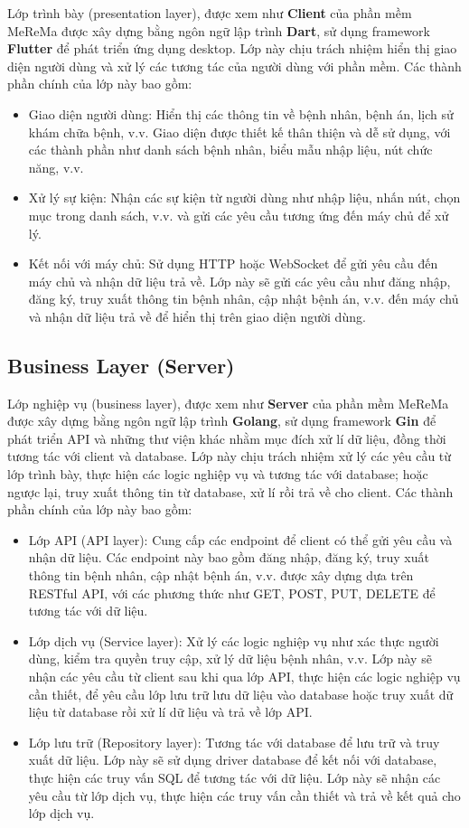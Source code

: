 Lớp trình bày (presentation layer), được xem như \textbf{Client} của phần mềm MeReMa được xây dựng bằng ngôn ngữ lập trình \textbf{Dart}, sử dụng framework \textbf{Flutter} để phát triển ứng dụng desktop. Lớp này chịu trách nhiệm hiển thị giao diện người dùng và xử lý các tương tác của người dùng với phần mềm. Các thành phần chính của lớp này bao gồm:
\begin{itemize}
  \item Giao diện người dùng: Hiển thị các thông tin về bệnh nhân, bệnh án, lịch sử khám chữa bệnh, v.v. Giao diện được thiết kế thân thiện và dễ sử dụng, với các thành phần như danh sách bệnh nhân, biểu mẫu nhập liệu,
    nút chức năng, v.v.
  \item Xử lý sự kiện: Nhận các sự kiện từ người dùng như nhập liệu, nhấn nút, chọn mục trong danh sách, v.v. và gửi các yêu cầu tương ứng đến máy chủ để xử lý.
  \item Kết nối với máy chủ: Sử dụng HTTP hoặc WebSocket để gửi yêu cầu đến máy chủ và nhận dữ liệu trả về. Lớp này sẽ gửi các yêu cầu như đăng nhập, đăng ký, truy xuất thông tin bệnh nhân, cập nhật bệnh án, v.v. đến máy chủ và nhận dữ liệu trả về để hiển thị trên giao diện người dùng.
\end{itemize}

\subsection{Business Layer (Server)}

Lớp nghiệp vụ (business layer), được xem như \textbf{Server} của phần mềm MeReMa được xây dựng bằng ngôn ngữ lập trình \textbf{Golang}, sử dụng framework \textbf{Gin} để phát triển API và những thư viện khác nhằm mục đích xử lí dữ liệu, đồng thời tương tác với client và database. Lớp này chịu trách nhiệm xử lý các yêu cầu từ lớp trình bày, thực hiện các logic nghiệp vụ và tương tác với database; hoặc ngược lại, truy xuất thông tin từ database, xử lí rồi trả về cho client. Các thành phần chính của lớp này bao gồm:
\begin{itemize}
  \item Lớp API (API layer): Cung cấp các endpoint để client có thể gửi yêu cầu và nhận dữ liệu. Các endpoint này bao gồm đăng nhập, đăng ký, truy xuất thông tin bệnh nhân, cập nhật bệnh án, v.v. được xây dựng dựa trên RESTful API, với các phương thức như GET, POST, PUT, DELETE để tương tác với dữ liệu.
  \item Lớp dịch vụ (Service layer): Xử lý các logic nghiệp vụ như xác thực người dùng, kiểm tra quyền truy cập, xử lý dữ liệu bệnh nhân, v.v. Lớp này sẽ nhận các yêu cầu từ client sau khi qua lớp API, thực hiện các logic nghiệp vụ cần thiết, để yêu cầu lớp lưu trữ lưu dữ liệu vào database hoặc truy xuất dữ liệu từ database rồi xử lí dữ liệu và trả về lớp API.
  \item Lớp lưu trữ (Repository layer): Tương tác với database để lưu trữ và truy xuất dữ liệu. Lớp này sẽ sử dụng driver database để kết nối với database, thực hiện các truy vấn SQL để tương tác với dữ liệu. Lớp này sẽ nhận các yêu cầu từ lớp dịch vụ, thực hiện các truy vấn cần thiết và trả về kết quả cho lớp dịch vụ.
\end{itemize}


